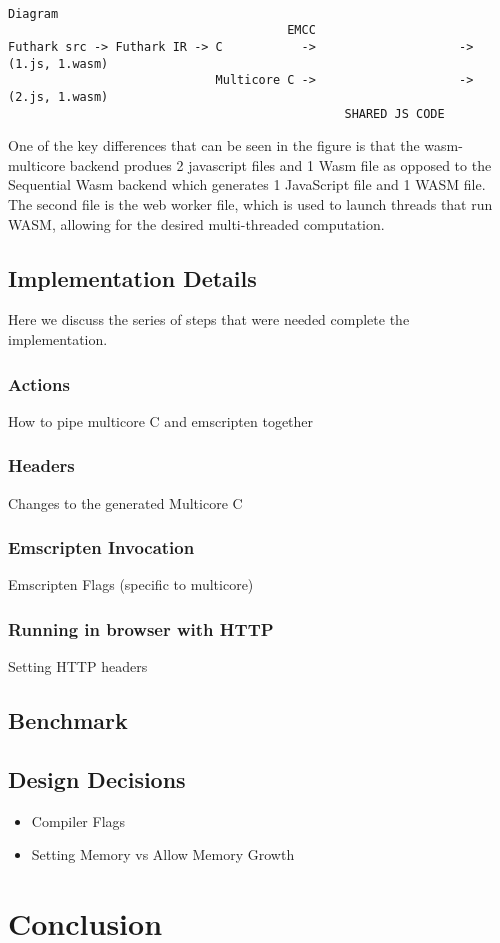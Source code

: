 \documentclass[11pt]{article}
\begin{document}
\begin{verbatim}
    
Diagram   
                                       EMCC
Futhark src -> Futhark IR -> C           ->                    -> (1.js, 1.wasm)
                             Multicore C ->                    -> (2.js, 1.wasm)
                                               SHARED JS CODE
\end{verbatim}

One of the key differences that can be seen in the figure is that the wasm-multicore backend produes 2 javascript files and 1 Wasm file as opposed to the Sequential Wasm backend which generates 1 JavaScript file and 1 WASM file. The second file is the web worker file, which is used to launch threads that run WASM, allowing for the desired multi-threaded computation.

\subsection{Implementation Details}
Here we discuss the series of steps that were needed complete the implementation.
\subsubsection{Actions}
How to pipe multicore C and emscripten together

\subsubsection{Headers}
Changes to the generated Multicore C


\subsubsection{Emscripten Invocation}
Emscripten Flags (specific to multicore)

\subsubsection{Running in browser with HTTP}
Setting HTTP headers


\subsection{Benchmark}




\subsection{Design Decisions}
\begin{itemize}
    \item Compiler Flags
    \item Setting Memory vs Allow Memory Growth
\end{itemize}

\section{Conclusion}
\end{document}

